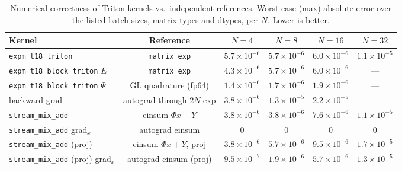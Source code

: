 \begin{table}[h]
\centering
\caption{Numerical correctness of Triton kernels vs.\ independent references. Worst-case (max) absolute error over the listed batch sizes, matrix types and dtypes, per $N$. Lower is better.}
\label{tab:expm_corr}
\begin{tabular}{lccccc}
\toprule
Kernel & Reference & $N{=}4$ & $N{=}8$ & $N{=}16$ & $N{=}32$ \\
\midrule
\texttt{expm\_t18\_triton}                & \texttt{matrix\_exp}      & $5.7{\times}10^{-6}$ & $5.7{\times}10^{-6}$ & $6.0{\times}10^{-6}$ & $1.1{\times}10^{-5}$ \\
\texttt{expm\_t18\_block\_triton} $E$     & \texttt{matrix\_exp}      & $4.3{\times}10^{-6}$ & $5.7{\times}10^{-6}$ & $6.0{\times}10^{-6}$ & --- \\
\texttt{expm\_t18\_block\_triton} $\Psi$  & GL quadrature (fp64)      & $1.4{\times}10^{-6}$ & $1.7{\times}10^{-6}$ & $1.9{\times}10^{-6}$ & --- \\
backward grad                             & autograd through $2N$ exp & $3.8{\times}10^{-6}$ & $1.3{\times}10^{-5}$ & $2.2{\times}10^{-5}$ & --- \\
\texttt{stream\_mix\_add}                 & einsum $\Phi x + Y$       & $3.8{\times}10^{-6}$ & $3.8{\times}10^{-6}$ & $7.6{\times}10^{-6}$ & $1.1{\times}10^{-5}$ \\
\texttt{stream\_mix\_add} grad$_x$        & autograd einsum           & $0$ & $0$ & $0$ & $0$ \\
\texttt{stream\_mix\_add} (proj)          & einsum $\Phi x + Y$, proj & $3.8{\times}10^{-6}$ & $5.7{\times}10^{-6}$ & $9.5{\times}10^{-6}$ & $1.7{\times}10^{-5}$ \\
\texttt{stream\_mix\_add} (proj) grad$_x$ & autograd einsum (proj)    & $9.5{\times}10^{-7}$ & $1.9{\times}10^{-6}$ & $5.7{\times}10^{-6}$ & $1.3{\times}10^{-5}$ \\
\bottomrule
\end{tabular}
\end{table}
